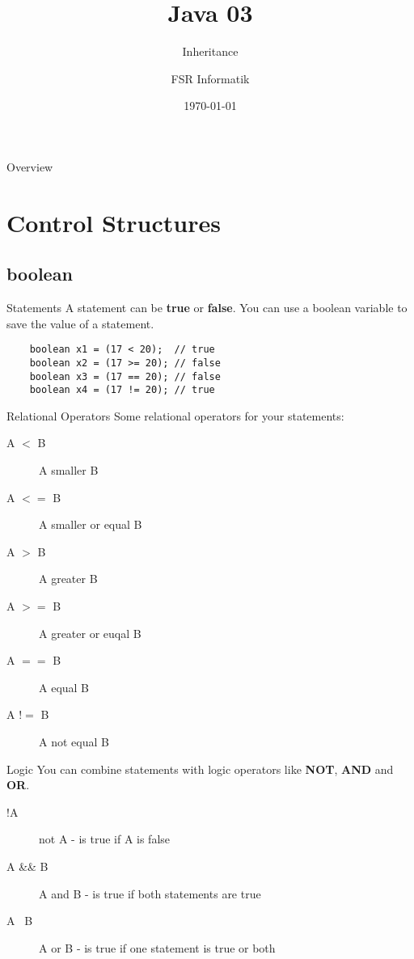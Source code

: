 

\title{Java 03}
\subtitle{Inheritance}
\author{FSR Informatik}
\date{\today}



\begin{frame}
\titlepage
\end{frame}
\begin{frame}{Overview}
\tableofcontents
\end{frame}

\section{Control Structures}
\subsection{boolean}
\begin{frame}[fragile]{Statements}
	A statement can be \textbf{true} or \textbf{false}. 
	You can use a boolean variable to save the value of a statement.
	\begin{lstlisting}
	boolean x1 = (17 < 20);  // true
	boolean x2 = (17 >= 20); // false
	boolean x3 = (17 == 20); // false
	boolean x4 = (17 != 20); // true
	\end{lstlisting}
\end{frame}

\begin{frame}{Relational Operators}
	Some relational operators for your statements:
	\begin{description}
		\item[A $<$ B] A smaller B
		\item[A $<=$ B] A smaller or equal B
		\item[A $>$ B] A greater B
		\item[A $>=$ B] A greater or euqal B
		\item[A $==$ B] A equal B
		\item[A $!=$ B] A not equal B
	\end{description}
\end{frame}

\begin{frame}{Logic}
	You can combine statements with logic operators like \textbf{NOT}, \textbf{AND} and \textbf{OR}.
	\begin{description}
		\item[!A] not A - is true if A is false
		\item[A \&\& B] A and B - is true if both statements are true
		\item[A \textbar\textbar\ B] A or B - is true if one statement is true or both
	\end{description}
\end{frame}

